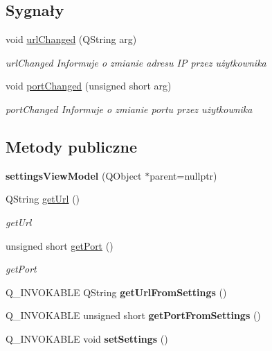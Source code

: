 \subsection*{Sygnały}
\begin{DoxyCompactItemize}
\item 
void \mbox{\hyperlink{classsettings_view_model_a7e9a10f475bc4b11ec576cf527070d10}{url\+Changed}} (Q\+String arg)
\begin{DoxyCompactList}\small\item\em url\+Changed Informuje o zmianie adresu IP przez użytkownika \end{DoxyCompactList}\item 
void \mbox{\hyperlink{classsettings_view_model_ab0cf0ae85d3173dea74ed54dae9fef73}{port\+Changed}} (unsigned short arg)
\begin{DoxyCompactList}\small\item\em port\+Changed Informuje o zmianie portu przez użytkownika \end{DoxyCompactList}\end{DoxyCompactItemize}
\subsection*{Metody publiczne}
\begin{DoxyCompactItemize}
\item 
\mbox{\label{classsettings_view_model_ac5d71573c7aefd1a2ba0f4486a351038}} 
{\bfseries settings\+View\+Model} (Q\+Object $\ast$parent=nullptr)
\item 
Q\+String \mbox{\hyperlink{classsettings_view_model_a6f81d1950b115d808899e5ea2fa607b3}{get\+Url}} ()
\begin{DoxyCompactList}\small\item\em get\+Url \end{DoxyCompactList}\item 
unsigned short \mbox{\hyperlink{classsettings_view_model_a021d67fc746244e4522cc6f38656cc1d}{get\+Port}} ()
\begin{DoxyCompactList}\small\item\em get\+Port \end{DoxyCompactList}\item 
\mbox{\label{classsettings_view_model_ab8a556ced5fbba706bbc876865b242ad}} 
Q\+\_\+\+I\+N\+V\+O\+K\+A\+B\+LE Q\+String {\bfseries get\+Url\+From\+Settings} ()
\item 
\mbox{\label{classsettings_view_model_a42a859605ffdc083f5a9e906c4951ab0}} 
Q\+\_\+\+I\+N\+V\+O\+K\+A\+B\+LE unsigned short {\bfseries get\+Port\+From\+Settings} ()
\item 
\mbox{\label{classsettings_view_model_ab53dce825dff35b4bbd9e65a60c1b7b0}} 
Q\+\_\+\+I\+N\+V\+O\+K\+A\+B\+LE void {\bfseries set\+Settings} ()
\end{DoxyCompactItemize}
